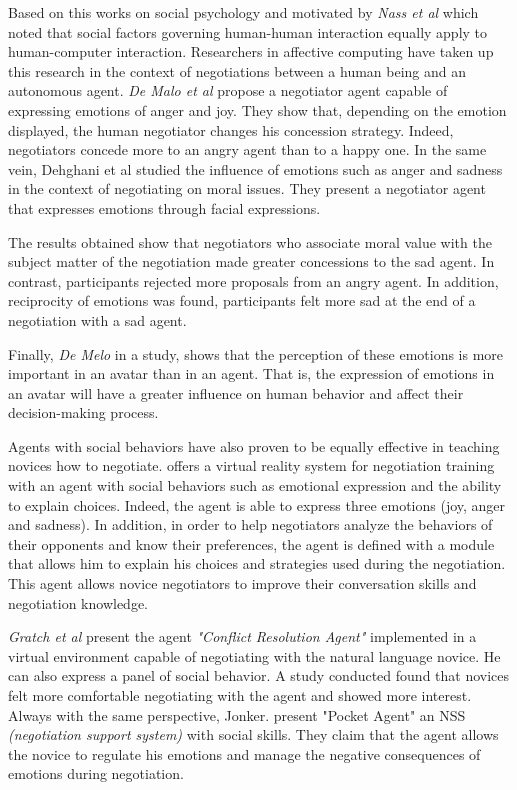 \documentclass[10pt, a4paper]{article} %
\begin{document}
	  Based on this works on social psychology and motivated by \emph{Nass et al} \cite{nass1994computers} which noted that social factors governing human-human interaction equally apply to human-computer interaction.  Researchers in affective computing have taken up this research in the context of negotiations between a human being and an autonomous agent. \emph{De Malo et al} \cite{de2011effect,de2015humans} propose a negotiator agent capable of expressing emotions of anger and joy. They show that, depending on the emotion displayed, the human negotiator changes his concession strategy. Indeed, negotiators concede more to an angry agent than to a happy one. In the same vein, Dehghani et al \cite{dehghani2014interpersonal} studied the influence of emotions such as anger and sadness in the context of negotiating on moral issues. They present a negotiator agent that expresses emotions through facial expressions.
	 
	 The results obtained show that negotiators who associate moral value with the subject matter of the negotiation made greater concessions to the sad agent. In contrast, participants rejected more proposals from an angry agent. In addition, reciprocity of emotions was found, participants felt more sad at the end of a negotiation with a sad agent.  
	 
	 Finally, \emph{De Melo} \cites{de2015humans} in a study, shows that the perception of these emotions is more important in an avatar than in an agent. That is, the expression of emotions in an avatar will have a greater influence on human behavior and affect their decision-making process.  
	 
	 Agents with social behaviors have also proven to be equally effective in teaching novices how to negotiate. \cite{broekens2012virtual} offers a virtual reality system for negotiation training with an agent with social behaviors such as emotional expression and the ability to explain choices. Indeed, the agent is able to express three emotions (joy, anger and sadness). In addition, in order to help negotiators analyze the behaviors of their opponents and know their preferences, the agent is defined with a module that allows him to explain his choices and strategies used during the negotiation. This agent allows novice negotiators to improve their conversation skills and negotiation knowledge. 
	 
	 \emph{Gratch et al} \cite{gratch2016benefits} present the agent \textit{"Conflict Resolution Agent"} implemented in a virtual environment capable of negotiating with the natural language novice. He can also express a panel of social behavior. A study conducted found that novices felt more comfortable negotiating with the agent and showed more interest. Always with the same perspective, Jonker. \cite{jonker2012negotiating} present "Pocket Agent" an NSS \emph{(negotiation support system)} with social skills. They claim that the agent allows the novice to regulate his emotions and manage the negative consequences of emotions during negotiation.
	 
\end{document}
